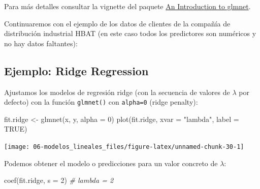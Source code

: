 \documentclass[
  spanish,
]{book}
\newenvironment{Shaded}{\begin{snugshade}}{\end{snugshade}}
\newcommand{\AttributeTok}[1]{\textcolor[rgb]{0.77,0.63,0.00}{#1}}
\newcommand{\CommentTok}[1]{\textcolor[rgb]{0.56,0.35,0.01}{\textit{#1}}}
\newcommand{\ConstantTok}[1]{\textcolor[rgb]{0.00,0.00,0.00}{#1}}
\newcommand{\DecValTok}[1]{\textcolor[rgb]{0.00,0.00,0.81}{#1}}
\newcommand{\FunctionTok}[1]{\textcolor[rgb]{0.00,0.00,0.00}{#1}}
\newcommand{\NormalTok}[1]{#1}
\newcommand{\OtherTok}[1]{\textcolor[rgb]{0.56,0.35,0.01}{#1}}
\newcommand{\SpecialCharTok}[1]{\textcolor[rgb]{0.00,0.00,0.00}{#1}}
\newcommand{\StringTok}[1]{\textcolor[rgb]{0.31,0.60,0.02}{#1}}
\theoremstyle{break}
\theoremstyle{definition}
\theoremstyle{definition}
\theoremstyle{definition}
\theoremstyle{definition}
\theoremstyle{remark}
\begin{document}
Para más detalles consultar la vignette del paquete \href{https://glmnet.stanford.edu/articles/glmnet.html}{An Introduction to glmnet}.

Continuaremos con el ejemplo de los datos de clientes de la compañía de distribución industrial HBAT (en este caso todos los predictores son numéricos y no hay datos faltantes):

\begin{Shaded}
\end{Shaded}

\hypertarget{ejemplo-ridge-regression}{%
\subsection{Ejemplo: Ridge Regression}\label{ejemplo-ridge-regression}}

Ajustamos los modelos de regresión ridge (con la secuencia de valores de \(\lambda\) por defecto) con la función \texttt{glmnet()} con \texttt{alpha=0} (ridge penalty):

\begin{Shaded}
\begin{Highlighting}[]
\NormalTok{fit.ridge }\OtherTok{\textless{}{-}} \FunctionTok{glmnet}\NormalTok{(x, y, }\AttributeTok{alpha =} \DecValTok{0}\NormalTok{)}
\FunctionTok{plot}\NormalTok{(fit.ridge, }\AttributeTok{xvar =} \StringTok{"lambda"}\NormalTok{, }\AttributeTok{label =} \ConstantTok{TRUE}\NormalTok{)}
\end{Highlighting}
\end{Shaded}

\begin{center}\texttt{[image: 06-modelos\_lineales\_files/figure-latex/unnamed-chunk-30-1]} \end{center}

Podemos obtener el modelo o predicciones para un valor concreto de \(\lambda\):

\begin{Shaded}
\begin{Highlighting}[]
\FunctionTok{coef}\NormalTok{(fit.ridge, }\AttributeTok{s =} \DecValTok{2}\NormalTok{) }\CommentTok{\# lambda = 2}
\end{Highlighting}
\end{Shaded}
\end{document}
